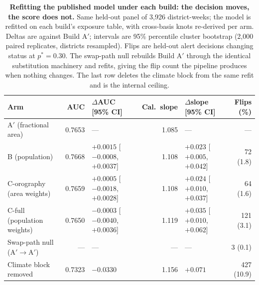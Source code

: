\begin{table}[htbp]
\centering
\small
\caption{\textbf{Refitting the published model under each build: the decision moves, the score does not.}\REBUILD{} Same held-out panel of 3{,}926 district-weeks; the model is refitted on each build's exposure table, with cross-basis knots re-derived per arm. Deltas are against Build A$'$; intervals are 95\% percentile cluster bootstrap (2{,}000 paired replicates, districts resampled). Flips are held-out alert decisions changing status at $p^*=0.30$. The swap-path null rebuilds Build A$'$ through the identical substitution machinery and refits, giving the flip count the pipeline produces when nothing changes. The last row deletes the climate block from the same refit and is the internal ceiling.}
\label{tab:wp5-refit}
\begin{tabular}{lrlrlr}
\toprule
Arm & AUC & $\Delta$AUC [95\% CI] & Cal.\ slope & $\Delta$slope [95\% CI] & Flips (\%) \\
\midrule
A$'$ (fractional area)      & 0.7653 & ---                                & 1.085 & ---                                & --- \\
B (population)              & 0.7668 & $+0.0015$ [$-0.0008$, $+0.0037$]   & 1.108 & $+0.023$ [$+0.005$, $+0.042$]      & 72 (1.8) \\
C-orography (area weights)  & 0.7659 & $+0.0005$ [$-0.0018$, $+0.0028$]   & 1.108 & $+0.024$ [$+0.010$, $+0.037$]      & 64 (1.6) \\
C-full (population weights) & 0.7650 & $-0.0003$ [$-0.0040$, $+0.0036$]   & 1.119 & $+0.035$ [$+0.010$, $+0.062$]      & 121 (3.1) \\
\midrule
Swap-path null (A$'\to$A$'$) & ---    & ---                               & ---   & ---                                & 3 (0.1) \\
Climate block removed        & 0.7323 & $-0.0330$                         & 1.156 & $+0.071$                           & 427 (10.9) \\
\bottomrule
\end{tabular}
\end{table}

